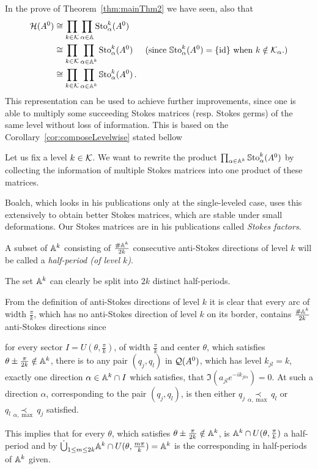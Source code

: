In the prove of Theorem~\ref{thm:mainThm2} we have seen,  also that
\begin{align*}
  \mathcal{H}(A^0)&\cong\prod_{k\in\mathcal{K}}\prod_{\alpha\in\mathbb{A}}\operatorname{Sto}_\alpha^k(A^0)
  \\&\cong\prod_{k\in\mathcal{K}}\prod_{\alpha\in\mathbb{A}^k}\operatorname{Sto}_\alpha^k(A^0)
  &\text{(since $\operatorname{\mathbb{S}to}_{\alpha}^{k}(A^0)=\{\operatorname{id}\}$ when $k\notin\mathcal{K}_\alpha$.)}
  \\&\cong\prod_{k\in\mathcal{K}}\prod_{\alpha\in\mathbb{A}^k}\operatorname{\mathbb{S}to}_\alpha^k(A^0) \,.
\end{align*}
This representation can be used to achieve further improvements, since one is
able to multiply some succeeding Stokes matrices (resp. Stokes germs) of the
same level without loss of information.
This is based on the Corollary~\ref{cor:composeLevelwise} stated bellow

Let us fix a level $k\in\mathcal{K}$. We want to rewrite the product
$\prod_{\alpha\in\mathbb{A}^k}\operatorname{\mathbb{S}to}_\alpha^k(A^0)$ by collecting the information of
multiple Stokes matrices into one product of these matrices.

\TODO[move?]
Boalch, which looks in his publications \cite{boalch,thboalch} only at the
single-leveled case, uses this extensively to obtain better Stokes matrices,
which are stable under small deformations. Our Stokes matrices are in his
publications called \emph{Stokes factors}.

\begin{defn}
  A subset of $\mathbb{A}^k$ consisting of $\frac{\#\mathbb{A}^k}{2k}$ consecutive anti-Stokes
  directions of level $k$ will be called a \emph{half-period (of level $k$)}.
  \begin{s-rem}
    The set $\mathbb{A}^k$ can clearly be split into $2k$ distinct half-periods.
  \end{s-rem}
\end{defn}
From the definition of anti-Stokes directions of level $k$ it is clear that
every arc of width $\frac{\pi}{k}$, which has no anti-Stokes direction of level
$k$ on its border, contains $\frac{\#\mathbb{A}^k}{2k}$ anti-Stokes directions
since
\begin{einr}
  for every sector $I=U(\theta,\frac{\pi}{k})$, of width $\frac{\pi}{k}$ and
  center $\theta$, which satisfies $\theta\pm\frac{\pi}{2k}\notin\mathbb{A}^k$,
  there is to any pair $(q_j,q_l)$ in $\mathcal{Q}(A^0)$, which has level $k_{jl}=k$,
  exactly one direction $\alpha\in \mathbb{A}^k\cap I$ which satisfies, that
  $\Im(a_{jl}e^{-ik_{jl\alpha}})=0$.
  At such a direction $\alpha$, corresponding to the pair $(q_j,q_l)$, is then
  either $q_j\underset{\alpha,\max}{\prec}q_l$ or
  $q_l\underset{\alpha,\max}{\prec}q_j$ satisfied.
\end{einr}
This implies that for every $\theta$, which satisfies
$\theta\pm\frac{\pi}{2k}\notin\mathbb{A}^k$, is $\mathbb{A}^k\cap U(\theta,\frac{\pi}{k})$
a half-period and by
$\dot\bigcup_{1\leq m\leq 2k}\mathbb{A}^k\cap U(\theta,\frac{m\pi}{k})=\mathbb{A}^k$ is the
corresponding  in half-periods of $\mathbb{A}^k$ given.

